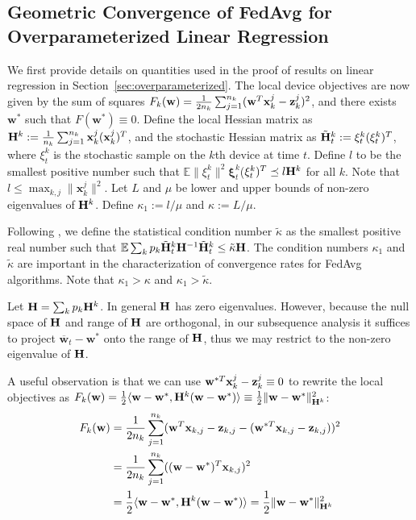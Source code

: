 \subsection{Geometric Convergence of FedAvg for Overparameterized Linear Regression}

We first provide details on quantities used in the proof of results on linear regression in Section~\ref{sec:overparameterized}. The local device objectives are now given by the sum of squares {\small$F_{k}(\mathbf{w})=\frac{1}{2n_{k}}\sum_{j=1}^{n_{k}}(\mathbf{w}^{T}\mathbf{x}_{k}^{j}-{\mathbf{z}}_{k}^{j})^{2}$},
and there exists $\mathbf{w}^{\ast}$ such that $F(\mathbf{w}^{\ast})\equiv0$. 
Define the local Hessian matrix as ${\mathbf{H}}^{k}:=\frac{1}{n_{k}}\sum_{j=1}^{n_{k}}\mathbf{x}_{k}^{j}(\mathbf{x}_{k}^{j})^{T}$, and the stochastic Hessian matrix as $\tilde{{\mathbf{H}}}_{t}^{k}:=\xi_{t}^{k}(\xi_{t}^{k})^{T}$, where $\xi_{t}^{k}$ is the stochastic sample on the $k$th device at
time $t$. Define $l$ to be the smallest positive number such that $\mathbb{E}\|\xi_{t}^{k}\|^{2}$$\mathbf{\xi}_{t}^{k}$($\mathbf{\xi}_{t}^{k})^{T}\preceq l{\mathbf{H}}^{k}$ for all $k$. Note that $l\leq\max_{k,j}\|\mathbf{x}_{k}^{j}\|^{2}$.
Let $L$ and $\mu$ be lower and upper bounds of non-zero eigenvalues
of ${\mathbf{H}}^{k}$. Define $\kappa_{1}:=l/\mu$ and $\kappa:=L/\mu$. 

Following
\cite{liu2018accelerating,jain2017accelerating}, we define the statistical
condition number $\tilde{\kappa}$ as the smallest positive real number
such that $\mathbb{E}\sum_{k}p_{k}\tilde{{\mathbf{H}}}_{t}^{k}{\mathbf{H}}^{-1}\tilde{{\mathbf{H}}}_{t}^{k}\leq\tilde{\kappa}{\mathbf{H}}$. 
The condition numbers $\kappa_{1}$ and $\tilde{\kappa}$
are important in the characterization of convergence rates for FedAvg
algorithms. Note that $\kappa_{1}>\kappa$ and $\kappa_{1}>\tilde{\kappa}$.


Let ${\mathbf{H}}=\sum_{k}p_k{\mathbf{H}}^k$. In general ${\mathbf{H}}$ has zero eigenvalues. However, because the null space
of ${\mathbf{H}}$ and range of ${\mathbf{H}}$ are orthogonal, in our subsequence analysis
it suffices to project $\overline{\mathbf{w}}_{t}-\mathbf{w}^{\ast}$
onto the range of ${\mathbf{H}}$, thus we may restrict to the non-zero eigenvalue
of ${\mathbf{H}}$. 

A useful observation is that we can use $\mathbf{w}^{\ast T}\mathbf{x}_{k}^{j}-{\mathbf{z}}_{k}^{j}\equiv0$
to rewrite the local objectives as $F_{k}(\mathbf{w})=\frac{1}{2}\langle\mathbf{w}-\mathbf{w}^{\ast},{\mathbf{H}}^{k}(\mathbf{w}-\mathbf{w}^{\ast})\rangle\equiv\frac{1}{2}\|\mathbf{w}-\mathbf{w}^{\ast}\|_{{\mathbf{H}}^{k}}^{2}$:
\begin{align*}
F_{k}({\mathbf{w}}) & =\frac{1}{2n_{k}}\sum_{j=1}^{n_{k}}({\mathbf{w}}^{T}{\mathbf{x}}_{k,j}-{\mathbf{z}}_{k,j}-({\mathbf{w}}^{\ast T}{\mathbf{x}}_{k,j}-{\mathbf{z}}_{k,j}))^{2}\\
& =\frac{1}{2n_{k}}\sum_{j=1}^{n_{k}}(({\mathbf{w}}-{\mathbf{w}}^{\ast})^{T}{\mathbf{x}}_{k,j})^{2}\\
& =\frac{1}{2}\langle {\mathbf{w}}-{\mathbf{w}}^{\ast},{\mathbf{H}}^{k}({\mathbf{w}}-{\mathbf{w}}^{\ast})\rangle=\frac{1}{2}\|{\mathbf{w}}-{\mathbf{w}}^{\ast}\|_{{\mathbf{H}}^{k}}^{2}
\end{align*}

